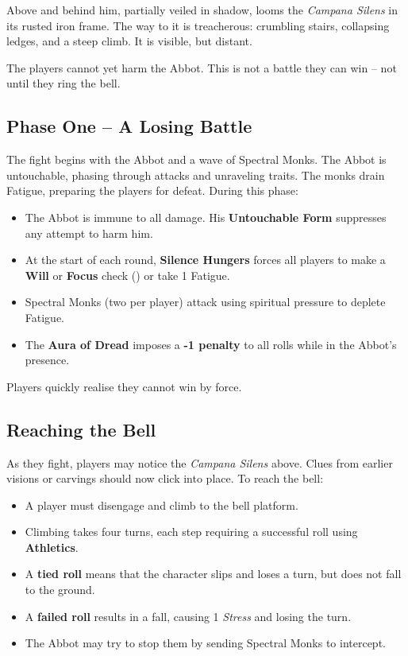Above and behind him, partially veiled in shadow, looms the \emph{Campana Silens} in its rusted iron frame. The way to it is treacherous: crumbling stairs, collapsing ledges, and a steep climb. It is visible, but distant.

The players cannot yet harm the Abbot. This is not a battle they can win – not until they ring the bell.

\subsection*{Phase One – A Losing Battle}

The fight begins with the Abbot and a wave of Spectral Monks. The Abbot is untouchable, phasing through attacks and unraveling traits. The monks drain Fatigue, preparing the players for defeat. During this phase:

\begin{Example}{}
    \begin{itemize}
    \item The Abbot is immune to all damage. His \textbf{Untouchable Form} suppresses any attempt to harm him.
    \item At the start of each round, \textbf{Silence Hungers} forces all players to make a \textbf{Will} or \textbf{Focus} check () or take 1 Fatigue.
    \item Spectral Monks (two per player) attack using spiritual pressure to deplete Fatigue.
    \item The \textbf{Aura of Dread} imposes a \textbf{-1 penalty} to all rolls while in the Abbot's presence.
    \end{itemize}
\end{Example}

\noindent
Players quickly realise they cannot win by force.

\subsection*{Reaching the Bell}



As they fight, players may notice the \emph{Campana Silens} above. Clues from earlier visions or carvings should now click into place. To reach the bell:

\begin{Example}{}
    \begin{itemize}\raggedright
    \item A player must disengage and climb to the bell platform.
    \item Climbing takes four turns, each step requiring a successful  roll using \textbf{Athletics}.
    \item A \textbf{tied roll} means that the character slips and loses a turn, but does not fall to the ground.
    \item A \textbf{failed roll} results in a fall, causing 1 \emph{Stress} and losing the turn.
    \item The Abbot may try to stop them by sending Spectral Monks to intercept.
    \end{itemize}
\end{Example}


